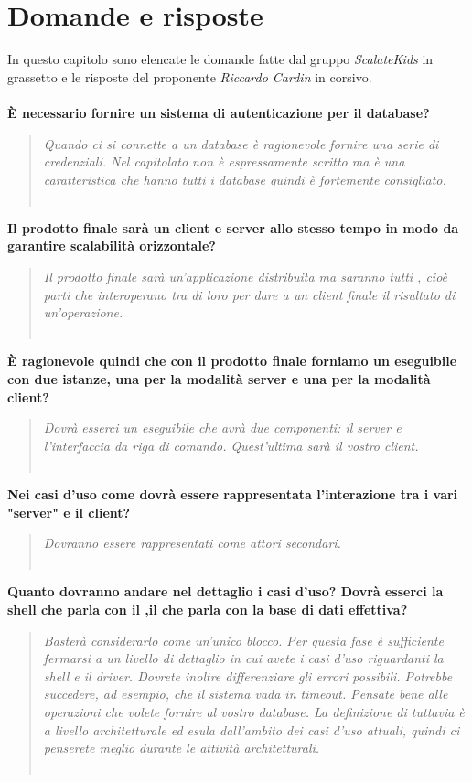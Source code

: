 \documentclass{scalatekids-article}
\begin{document}
\section{Domande e risposte}
In questo capitolo sono elencate le domande fatte dal gruppo \textit{ScalateKids} in grassetto e le risposte del proponente \textit{Riccardo Cardin} in corsivo.
\textbf{\\ \\È necessario fornire un sistema di autenticazione per il database?}
\begin{quote}
  \textit{Quando ci si connette a un database è ragionevole fornire una serie di credenziali. Nel capitolato non è espressamente scritto ma è una caratteristica che hanno tutti i database quindi è fortemente consigliato.\\ \\}
\end{quote}
\textbf{Il prodotto finale sarà un client e server allo stesso tempo in modo da garantire scalabilità orizzontale?}
\begin{quote}
  \textit{Il prodotto finale sarà un'applicazione distribuita ma saranno tutti , cioè parti che interoperano tra di loro per dare a un client finale il risultato di un'operazione.\\ \\}
\end{quote}
\textbf{È ragionevole quindi che con il prodotto finale forniamo un eseguibile con due istanze, una per la modalità server e una per la modalità client?}
\begin{quote}
  \textit{Dovrà esserci un eseguibile che avrà due componenti: il server e l'interfaccia da riga di comando. Quest'ultima sarà il vostro client.\\ \\}
\end{quote}
\textbf{Nei casi d'uso come dovrà essere rappresentata l'interazione tra i vari "server" e il client?}
\begin{quote}
  \textit{Dovranno essere rappresentati come attori secondari.\\ \\}
\end{quote}
\textbf{Quanto dovranno andare nel dettaglio i casi d'uso? Dovrà esserci la shell che parla con il ,il  che parla con la base di dati effettiva?}
\begin{quote}
  \textit{Basterà considerarlo come un'unico blocco. Per questa fase è sufficiente fermarsi a un livello di dettaglio in cui avete i casi d'uso riguardanti la shell e il driver. Dovrete inoltre differenziare gli errori possibili. Potrebbe succedere, ad esempio, che il sistema vada in timeout. Pensate bene alle operazioni che volete fornire al vostro database. La definizione di  tuttavia è a livello architetturale ed esula dall'ambito dei casi d'uso attuali, quindi ci penserete meglio durante le attività architetturali.\\ \\}
\end{quote}
\end{document}
